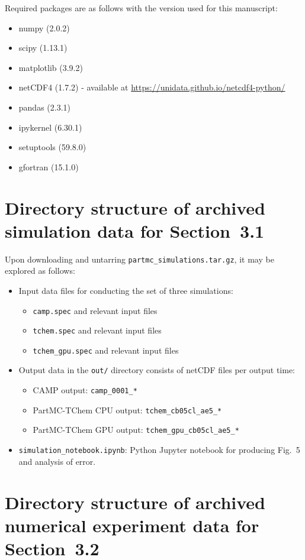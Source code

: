 \documentclass[gmd,manuscript]{copernicus}
\begin{document}
Required packages are as follows with the version used for this manuscript:
\begin{itemize}
\item numpy (2.0.2)
\item scipy (1.13.1)
\item matplotlib (3.9.2)
\item netCDF4 (1.7.2) - available at \url{https://unidata.github.io/netcdf4-python/}
\item pandas (2.3.1)
\item ipykernel (6.30.1)
\item setuptools (59.8.0)
\item gfortran (15.1.0)
\end{itemize}


\section*{Directory structure of archived simulation data for Section~3.1}

Upon downloading and untarring \texttt{partmc\_simulations.tar.gz},  it may be explored as follows:

\begin{itemize}
    \item Input data files for conducting the set of three simulations:
    \begin{itemize}
      \item \texttt{camp.spec} and relevant input files
      \item \texttt{tchem.spec} and relevant input files
      \item \texttt{tchem\_gpu.spec} and relevant input files
    \end{itemize}
    \item Output data in the \texttt{out/} directory consists of netCDF files per output time:
	\begin{itemize}
	  \item CAMP output: \texttt{camp\_0001\_*}
	  \item PartMC-TChem CPU output: \texttt{tchem\_cb05cl\_ae5\_*}
	  \item PartMC-TChem GPU output: \texttt{tchem\_gpu\_cb05cl\_ae5\_*}
	\end{itemize}
	\item \texttt{simulation\_notebook.ipynb}: Python Jupyter notebook for producing Fig.~5 and analysis of error.
\end{itemize}

\section*{Directory structure of archived numerical experiment data  for Section~3.2}
\end{document}
